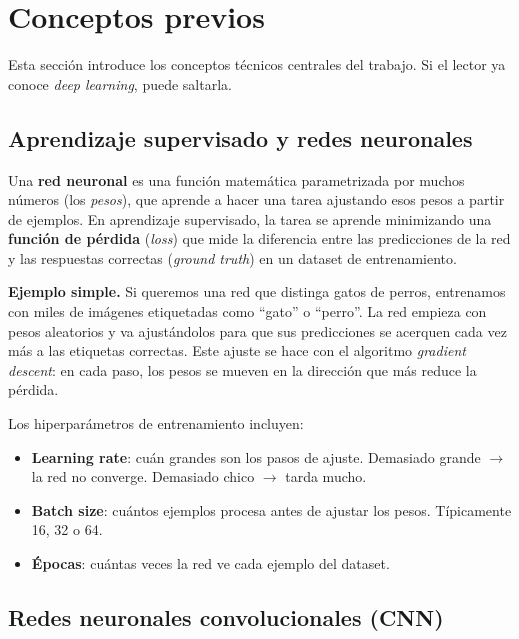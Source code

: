 \documentclass[a4paper,11pt]{article}
\begin{document}
\vspace{0.4cm}

\section{Conceptos previos}
\label{sec:conceptos}

Esta sección introduce los conceptos técnicos centrales del trabajo. Si el lector ya conoce \textit{deep learning}, puede saltarla.

\subsection{Aprendizaje supervisado y redes neuronales}

Una \textbf{red neuronal} es una función matemática parametrizada por muchos números (los \textit{pesos}), que aprende a hacer una tarea ajustando esos pesos a partir de ejemplos. En aprendizaje supervisado, la tarea se aprende minimizando una \textbf{función de pérdida} (\textit{loss}) que mide la diferencia entre las predicciones de la red y las respuestas correctas (\textit{ground truth}) en un dataset de entrenamiento.

\begin{concepto}
\textbf{Ejemplo simple.} Si queremos una red que distinga gatos de perros, entrenamos con miles de imágenes etiquetadas como ``gato'' o ``perro''. La red empieza con pesos aleatorios y va ajustándolos para que sus predicciones se acerquen cada vez más a las etiquetas correctas. Este ajuste se hace con el algoritmo \textit{gradient descent}: en cada paso, los pesos se mueven en la dirección que más reduce la pérdida.
\end{concepto}

Los hiperparámetros de entrenamiento incluyen:
\begin{itemize}[itemsep=1pt]
    \item \textbf{Learning rate}: cuán grandes son los pasos de ajuste. Demasiado grande $\rightarrow$ la red no converge. Demasiado chico $\rightarrow$ tarda mucho.
    \item \textbf{Batch size}: cuántos ejemplos procesa antes de ajustar los pesos. Típicamente 16, 32 o 64.
    \item \textbf{Épocas}: cuántas veces la red ve cada ejemplo del dataset.
\end{itemize}

\subsection{Redes neuronales convolucionales (CNN)}
\label{sec:cnn}
\end{document}
